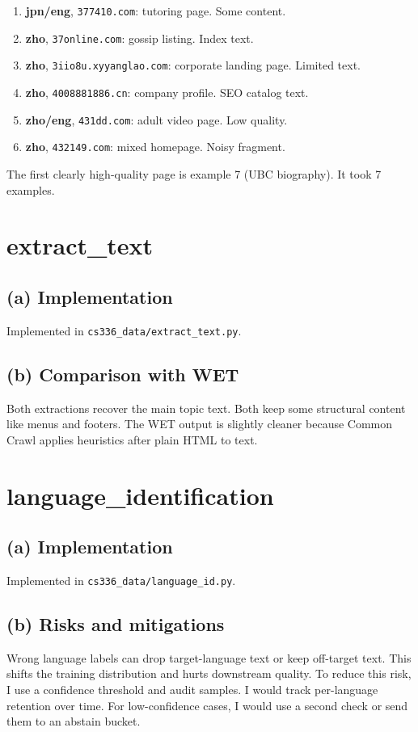 \documentclass[11pt]{article}
\newcommand{\answer}[1]{#1}
\begin{document}
{\begin{enumerate}
    \item \textbf{jpn/eng}, \texttt{377410.com}: tutoring page. Some content.
    \item \textbf{zho}, \texttt{37online.com}: gossip listing. Index text.
    \item \textbf{zho}, \texttt{3iio8u.xyyanglao.com}: corporate landing page. Limited text.
    \item \textbf{zho}, \texttt{4008881886.cn}: company profile. SEO catalog text.
    \item \textbf{zho/eng}, \texttt{431dd.com}: adult video page. Low quality.
    \item \textbf{zho}, \texttt{432149.com}: mixed homepage. Noisy fragment.
\end{enumerate}
The first clearly high-quality page is example 7 (UBC biography). It took 7 examples.
}

\section{extract\_text}
\subsection*{(a) Implementation}
\answer{Implemented in \texttt{cs336\_data/extract\_text.py}.}

\subsection*{(b) Comparison with WET}
\answer{Both extractions recover the main topic text. Both keep some structural content like menus and footers. The WET output is slightly cleaner because Common Crawl applies heuristics after plain HTML to text.}

\section{language\_identification}
\subsection*{(a) Implementation}
\answer{Implemented in \texttt{cs336\_data/language\_id.py}.}

\subsection*{(b) Risks and mitigations}
\answer{Wrong language labels can drop target-language text or keep off-target text. This shifts the training distribution and hurts downstream quality. To reduce this risk, I use a confidence threshold and audit samples. I would track per-language retention over time. For low-confidence cases, I would use a second check or send them to an abstain bucket.}
\end{document}
